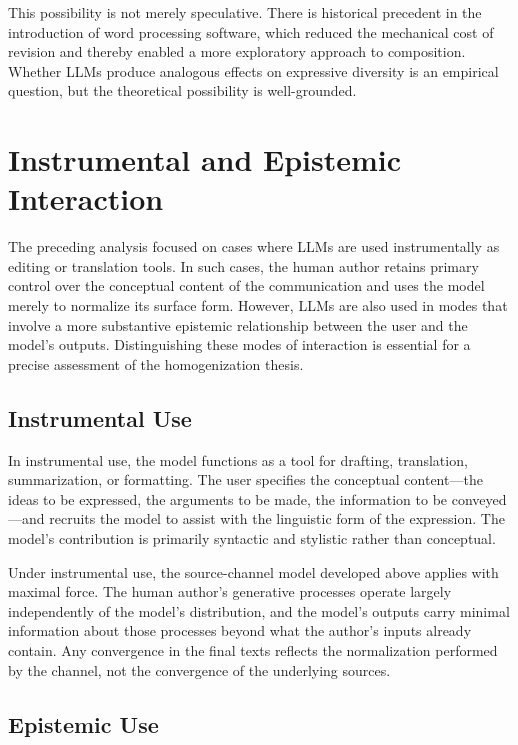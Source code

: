 \documentclass[12pt,a4paper]{article}
\theoremstyle{definition}
\theoremstyle{plain}
\theoremstyle{remark}
\begin{document}
This possibility is not merely speculative. There is historical precedent in the introduction
of word processing software, which reduced the mechanical cost of revision and thereby enabled
a more exploratory approach to composition. Whether LLMs produce analogous effects on
expressive diversity is an empirical question, but the theoretical possibility is well-grounded.

\section{Instrumental and Epistemic Interaction}
\label{sec:instrumental}

The preceding analysis focused on cases where LLMs are used instrumentally as editing or
translation tools. In such cases, the human author retains primary control over the conceptual
content of the communication and uses the model merely to normalize its surface form. However,
LLMs are also used in modes that involve a more substantive epistemic relationship between
the user and the model's outputs. Distinguishing these modes of interaction is essential for
a precise assessment of the homogenization thesis.

\subsection{Instrumental Use}

In instrumental use, the model functions as a tool for drafting, translation, summarization,
or formatting. The user specifies the conceptual content---the ideas to be expressed, the
arguments to be made, the information to be conveyed---and recruits the model to assist with
the linguistic form of the expression. The model's contribution is primarily syntactic and
stylistic rather than conceptual.

Under instrumental use, the source-channel model developed above applies with maximal force.
The human author's generative processes operate largely independently of the model's
distribution, and the model's outputs carry minimal information about those processes
beyond what the author's inputs already contain. Any convergence in the final texts reflects
the normalization performed by the channel, not the convergence of the underlying sources.

\subsection{Epistemic Use}
\end{document}
